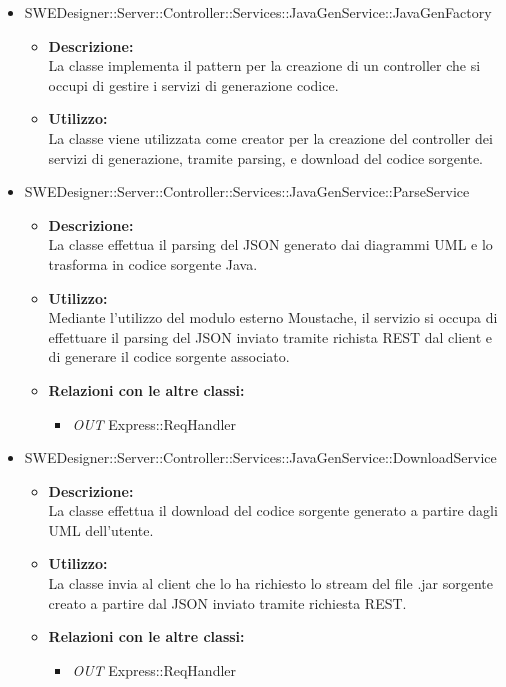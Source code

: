 		\begin{itemize}
			\item SWEDesigner::Server::Controller::Services::JavaGenService::JavaGenFactory
			\begin{itemize}
				\item \textbf{Descrizione: }\\
				La classe implementa il pattern  per la creazione di un controller che si occupi di gestire i servizi di generazione codice.
				\item \textbf{Utilizzo: }\\
				La classe viene utilizzata come creator per la creazione del controller dei servizi di generazione, tramite parsing, e download del codice sorgente.
			\end{itemize}
			\item SWEDesigner::Server::Controller::Services::JavaGenService::ParseService
			\begin{itemize}
				\item \textbf{Descrizione: }\\
				La classe effettua il parsing del JSON generato dai diagrammi UML e lo trasforma in codice sorgente Java.
				\item \textbf{Utilizzo: }\\
				Mediante l'utilizzo del modulo esterno Moustache, il servizio si occupa di effettuare il parsing del JSON inviato tramite richista REST dal client e di generare
				il codice sorgente associato.
				\item \textbf{Relazioni con le altre classi: }
				\begin{itemize}
					\item \emph{OUT} Express::ReqHandler
				\end{itemize}
			\end{itemize}
			\item SWEDesigner::Server::Controller::Services::JavaGenService::DownloadService
			\begin{itemize}
				\item \textbf{Descrizione: }\\
				La classe effettua il download del codice sorgente generato a partire dagli UML dell'utente.
				\item \textbf{Utilizzo: }\\
				La classe invia al client che lo ha richiesto lo stream del file .jar sorgente creato a partire dal JSON inviato tramite richiesta REST.
				\item \textbf{Relazioni con le altre classi: }
				\begin{itemize}
					\item \emph{OUT} Express::ReqHandler
				\end{itemize}
			\end{itemize}
		\end{itemize}

